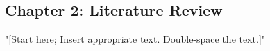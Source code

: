 \newpage
\begin{singlespace}
\section{\protect \centering Chapter 2: Literature Review}
\end{singlespace}
\doublespacing
\noindent "[Start here; Insert appropriate text. Double-space the text.]"